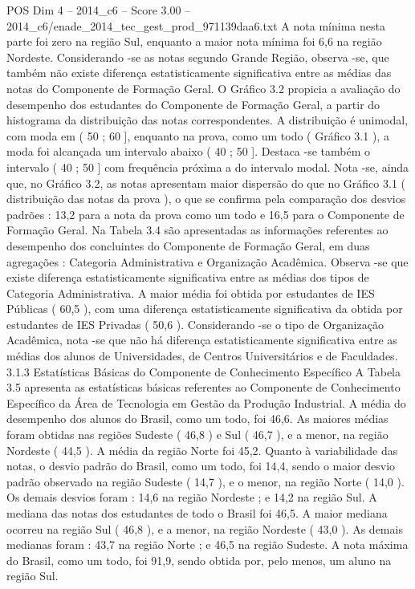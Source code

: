 \begin{textsample}{POS Dim 4 – 2014\_c6 – Score 3.00 – 2014\_c6/enade\_2014\_tec\_gest\_prod\_971139daa6.txt}
A nota mínima nesta parte foi zero na região Sul, enquanto a maior nota mínima foi 6,6 na região Nordeste.
Considerando -se as notas segundo Grande Região, observa -se, que também não existe diferença estatisticamente significativa entre as médias das notas do Componente de Formação Geral.
O Gráfico 3.2 propicia a avaliação do desempenho dos estudantes do Componente de Formação Geral, a partir do histograma da distribuição das notas correspondentes.
A distribuição é unimodal, com moda em ( 50 ; 60 ], enquanto na prova, como um todo ( Gráfico 3.1 ), a moda foi alcançada um intervalo abaixo ( 40 ; 50 ].
Destaca -se também o intervalo ( 40 ; 50 ] com frequência próxima a do intervalo modal.
Nota -se, ainda que, no Gráfico 3.2, as notas apresentam maior dispersão do que no Gráfico 3.1 ( distribuição das notas da prova ), o que se confirma pela comparação dos desvios padrões : 13,2 para a nota da prova como um todo e 16,5 para o Componente de Formação Geral.
Na Tabela 3.4 são apresentadas as informações referentes ao desempenho dos concluintes do Componente de Formação Geral, em duas agregações : Categoria Administrativa e Organização Acadêmica.
Observa -se que existe diferença estatisticamente significativa entre as médias dos tipos de Categoria Administrativa.
A maior média foi obtida por estudantes de IES Públicas ( 60,5 ), com uma diferença estatisticamente significativa da obtida por estudantes de IES Privadas ( 50,6 ).
Considerando -se o tipo de Organização Acadêmica, nota -se que não há diferença estatisticamente significativa entre as médias dos alunos de Universidades, de Centros Universitários e de Faculdades. 3.1.3 Estatísticas Básicas do Componente de Conhecimento Específico A Tabela 3.5 apresenta as estatísticas básicas referentes ao Componente de Conhecimento Específico da Área de Tecnologia em Gestão da Produção Industrial.
A média do desempenho dos alunos do Brasil, como um todo, foi 46,6.
As maiores médias foram obtidas nas regiões Sudeste ( 46,8 ) e Sul ( 46,7 ), e a menor, na região Nordeste ( 44,5 ).
A média da região Norte foi 45,2.
Quanto à variabilidade das notas, o desvio padrão do Brasil, como um todo, foi 14,4, sendo o maior desvio padrão observado na região Sudeste ( 14,7 ), e o menor, na região Norte ( 14,0 ).
Os demais desvios foram : 14,6 na região Nordeste ; e 14,2 na região Sul.
A mediana das notas dos estudantes de todo o Brasil foi 46,5.
A maior mediana ocorreu na região Sul ( 46,8 ), e a menor, na região Nordeste ( 43,0 ).
As demais medianas foram : 43,7 na região Norte ; e 46,5 na região Sudeste.
A nota máxima do Brasil, como um todo, foi 91,9, sendo obtida por, pelo menos, um aluno na região Sul.

\end{textsample}
